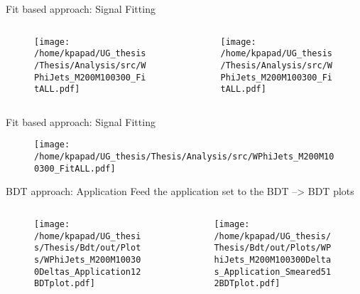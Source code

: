 \documentclass[bigger]{beamer}
\begin{document}
\begin{frame}[label={sec:orgea08e33}]{Fit based approach: Signal Fitting}
\begin{columns}
\begin{column}{0.5\columnwidth}
\begin{figure}[h]
\centering
\texttt{[image: /home/kpapad/UG\_thesis/Thesis/Analysis/src/WPhiJets\_M200M100300\_FitALL.pdf]}
\end{figure}
\end{column}

\begin{column}{0.5\columnwidth}
\begin{figure}[h]
\centering
\texttt{[image: /home/kpapad/UG\_thesis/Thesis/Analysis/src/WPhiJets\_M200M100300\_FitALL.pdf]}
\end{figure}
\end{column}
\end{columns}
\end{frame}

\begin{frame}[label={sec:orgca944e6}]{Fit based approach: Signal Fitting}
\begin{figure}[h]
\centering
\texttt{[image: /home/kpapad/UG\_thesis/Thesis/Analysis/src/WPhiJets\_M200M100300\_FitALL.pdf]}
\end{figure}
\end{frame}


\begin{frame}[label={sec:org1271819}]{BDT approach: Application}
Feed the application set to the BDT --> BDT plots
\begin{columns}
\begin{column}{0.5\columnwidth}
\begin{figure}[h]
\centering
\texttt{[image: /home/kpapad/UG\_thesis/Thesis/Bdt/out/Plots/WPhiJets\_M200M100300Deltas\_Application12BDTplot.pdf]}
\end{figure}
\end{column}
\begin{column}{0.5\columnwidth}
\begin{figure}[h]
\centering
\texttt{[image: /home/kpapad/UG\_thesis/Thesis/Bdt/out/Plots/WPhiJets\_M200M100300Deltas\_Application\_Smeared512BDTplot.pdf]}
\end{figure}
\end{column}
\end{columns}
\end{frame}
\end{document}
